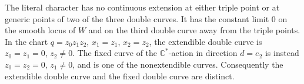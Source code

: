 \begin{proposition}\hypertarget{tag-02PB}{}\label{mapsI:src:A.1.2}

The literal character has no continuous extension at either
triple point or at generic points of two of the three double
curves.  It has the constant limit $0$ on the smooth locus of
$W$ and on the third double curve away from the triple points.
In the chart $q=z_0z_1z_2$, $x_1=z_1$, $x_2=z_2$, the extendible
double curve is $z_0=z_1=0$, $z_2\ne0$.  The fixed curve of the
$\mathbb C^*$-action in direction $d=e_2$ is instead
$z_0=z_2=0$, $z_1\ne0$, and is one of the nonextendible curves.
Consequently the extendible double curve and the fixed double curve are distinct.
\end{proposition}



